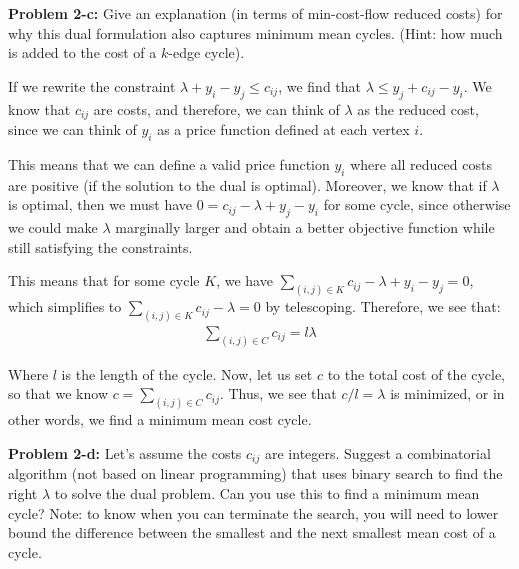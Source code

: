 \documentclass[psamsfonts]{amsart}
\newenvironment{sol}{\vspace{0.25cm}{\large \bfseries Solution:}}{\qedsymbol}
\newenvironment{prob}[1]{\begin{framed}{\large \bfseries Problem #1:}}{\end{framed}}
\begin{document}
\begin{prob}{2-c}
Give an explanation (in terms of min-cost-flow reduced costs) for why this dual formulation also captures minimum mean cycles. (Hint: how much is added to the cost of a $k$-edge cycle).
\end{prob}

\begin{sol}
If we rewrite the constraint $\lambda + y_i - y_j \leq c_{ij}$, we find that $\lambda \leq y_j + c_{ij} - y_i$. We know that $c_{ij}$ are costs, and therefore, we can think of $\lambda$ as the reduced cost, since we can think of $y_i$ as a price function defined at each vertex $i$.

This means that we can define a valid price function $y_i$ where all reduced costs are positive (if the solution to the dual is optimal). Moreover, we know that if $\lambda$ is optimal, then we must have $0 = c_{ij} - \lambda + y_j - y_i$ for some cycle, since otherwise we could make $\lambda$ marginally larger and obtain a better objective function while still satisfying the constraints.    

This means that for some cycle $K$, we have $\sum_{(i,j) \in K} c_{ij} - \lambda + y_i - y_j = 0$, which simplifies to $\sum_{(i,j) \in K} c_{ij} - \lambda = 0$ by telescoping. Therefore, we see that:
\begin{eqnarray}
\sum_{(i,j) \in C} c_{ij} = l \lambda
\end{eqnarray}

Where $l$ is the length of the cycle. Now, let us set $c$ to the total cost of the cycle, so that we know $c = \sum_{(i,j) \in C} c_{ij}$. Thus, we see that $c/l = \lambda$ is minimized, or in other words, we find a minimum mean cost cycle.
\end{sol}

\begin{prob}{2-d}
Let's assume the costs $c_{ij}$ are integers. Suggest a combinatorial algorithm (not based on linear programming) that uses binary search to find the right $\lambda$ to solve the dual problem. Can you use this to find a minimum mean cycle? Note: to know when you can terminate the search, you will need to lower bound the difference between the smallest and the next smallest mean cost of a cycle.
\end{prob}
\end{document}
